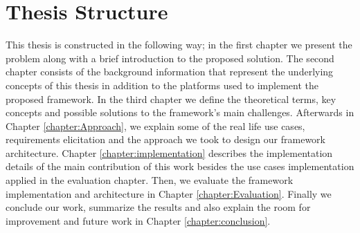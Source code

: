  


\section{Thesis Structure}

This thesis is constructed in the following way; in the first chapter we present the problem along with a brief introduction to the proposed solution. The second chapter consists of the background information  that represent the underlying  concepts of this thesis in addition to the platforms used to implement the proposed framework. In the third chapter we define the theoretical terms, key concepts and possible solutions to the framework's main challenges. Afterwards in Chapter \ref{chapter:Approach}, we explain some of the real life use cases, requirements elicitation and the approach we took to design our framework architecture. Chapter \ref{chapter:implementation} describes the implementation details of the main contribution of this work besides the use cases implementation applied in the evaluation chapter. Then, we evaluate the framework implementation and  architecture in Chapter \ref{chapter:Evaluation}. Finally we conclude our work, summarize the results and also explain the room for improvement and future work in Chapter \ref{chapter:conclusion}.